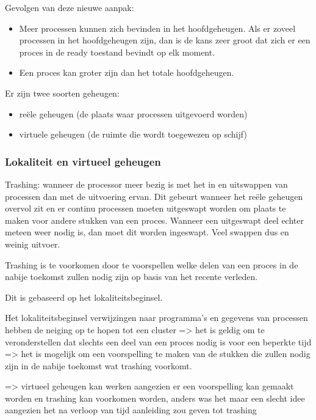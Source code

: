 Gevolgen van deze nieuwe aanpak:

\begin{itemize}
\item Meer processen kunnen zich bevinden in het hoofdgeheugen. Als er zoveel processen in het hoofdgeheugen zijn, dan is de kans zeer groot dat zich er een proces in de ready toestand bevindt op elk moment.
\item Een proces kan groter zijn dan het totale hoofdgeheugen. 
\end{itemize}

Er zijn twee soorten geheugen:

\begin{itemize}
\item reële geheugen (de plaats waar processen uitgevoerd worden)
\item virtuele geheugen (de ruimte die wordt toegewezen op schijf)
\end{itemize}

\subsubsection{Lokaliteit en virtueel geheugen}

Trashing: wanneer de processor meer bezig is met het in en uitswappen van processen dan met de uitvoering ervan. Dit gebeurt wanneer het reële geheugen overvol zit en er continu processen moeten uitgeswapt worden om plaats te maken voor andere stukken van een proces. Wanneer een uitgeswapt deel echter meteen weer nodig is, dan moet dit worden ingeswapt. Veel swappen dus en weinig uitvoer.

Trashing is te voorkomen door te voorspellen welke delen van een proces in de nabije toekomst zullen nodig zijn op basis van het recente verleden.

Dit is gebaseerd op het lokaliteitsbeginsel.

Het lokaliteitsbeginsel verwijzingen naar programma's en gegevens van processen hebben de neiging op te hopen tot een cluster => het is geldig om te veronderstellen dat slechts een deel van een proces nodig is voor een beperkte tijd => het is mogelijk om een voorspelling te maken van de stukken die zullen nodig zijn in de nabije toekomst wat trashing voorkomt.

=> virtueel geheugen kan werken aangezien er een voorspelling kan gemaakt worden en trashing kan voorkomen worden, anders was het maar een slecht idee aangezien het na verloop van tijd aanleiding zou geven tot trashing

